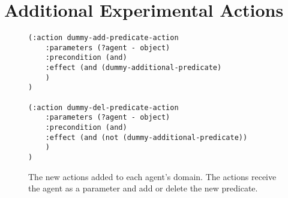 \documentclass[letterpaper]{article} %
\theoremstyle{definition}
\theoremstyle{remark}
\newcommand{\noop}{\textit{NO-OP}\xspace}
\begin{document}


\section{Additional Experimental Actions}  

\begin{figure}[ht]
\begin{center}
\begingroup
    \fontsize{8pt}{8pt}\selectfont
\begin{Verbatim}[commandchars=\\\{\}]
(:action dummy-add-predicate-action
    :parameters (?agent - object)
    :precondition (and)
    :effect (and (dummy-additional-predicate)
    )
)

(:action dummy-del-predicate-action
    :parameters (?agent - object)
    :precondition (and)
    :effect (and (not (dummy-additional-predicate))
    )
)
\end{Verbatim}
\endgroup
\caption{The new actions added to each agent's domain. The actions receive the agent as a parameter and add or delete the new predicate.}
\label{list:new-actions-to-domain}
\end{center}
\end{figure}
\end{document}
